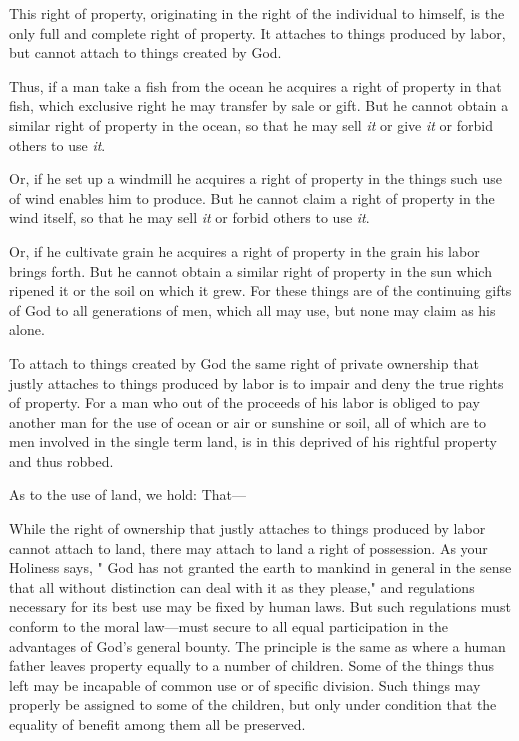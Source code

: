 \documentclass{book}
\begin{document}
This right of property, originating in the right of the individual to himself, is the only full and complete right of property. It attaches to things produced by labor, but cannot attach to things created by God.

Thus, if a man take a fish from the ocean he acquires a right of property in that fish, which exclusive right he may transfer by sale or gift. But he cannot obtain a similar right of property in the ocean, so that he may sell \emph{it} or give \emph{it} or forbid others to use \emph{it}.

Or, if he set up a windmill he acquires a right of property in the things such use of wind enables him to produce. But he cannot claim a right of property in the wind itself, so that he may sell \emph{it} or forbid others to use \emph{it}.

Or, if he cultivate grain he acquires a right of property in the grain his labor brings forth. But he cannot obtain a similar right of property in the sun which ripened it or the soil on which it grew. For these things are of the continuing gifts of God to all generations of men, which all may use, but none may claim as his alone.

To attach to things created by God the same right of private ownership that justly attaches to things produced by labor is to impair and deny the true rights of property. For a man who out of the proceeds of his labor is obliged to pay another man for the use of ocean or air or sunshine or soil, all of which are to men involved in the single term land, is in this deprived of his rightful property and thus robbed.

As to the use of land, we hold: That—

While the right of ownership that justly attaches to things produced by labor cannot attach to land, there may attach to land a right of possession. As your Holiness says, " God has not granted the earth to mankind in general in the sense that all without distinction can deal with it as they please," and regulations necessary for its best use may be fixed by human laws. But such regulations must conform to the moral law—must secure to all equal participation in the advantages of God’s general bounty. The principle is the same as where a human father leaves property equally to a number of children. Some of the things thus left may be incapable of common use or of specific division. Such things may properly be assigned to some of the children, but only under condition that the equality of benefit among them all be preserved.
\end{document}

